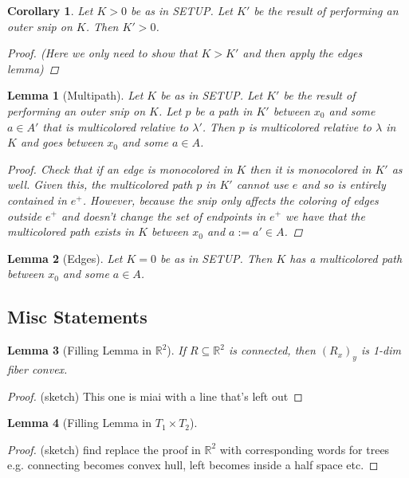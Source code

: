 \documentclass{article}
\newcommand{\rxy}{(R_x)_y}
\theoremstyle{mystyle}
\newtheorem{lem}{Lemma}[section]
\newtheorem*{cor*}{Corollary}
\theoremstyle{remark}
\begin{document}
\begin{cor*}
	Let \(K > 0\) be as in SETUP. Let \(K'\) be the result of performing an outer snip on \(K\). Then \(K' > 0\).
	\begin{proof}
        (Here we only need to show that \(K > K'\) and then apply the edges lemma)
		
	\end{proof}
\end{cor*}
\begin{lem}
	[Multipath]
	 \label{lem:multi} 
	Let \(K\) be as in SETUP. Let \(K'\) be the result of performing an outer snip on \(K\). Let \(p\) be a path in \(K'\) between \(x_{0}\) and some \(a \in A'\) that is {\em multicolored} relative to \(\lambda'\). Then \(p\) is multicolored relative to \(\lambda\) in \(K\) and goes between \(x_{0}\) and some \(a \in A\).
	\begin{proof}
		Check that if an edge is monocolored in \(K\) then it is monocolored in \(K'\) as well. Given this, the multicolored path \(p\) in \(K'\) cannot use \(e\) and so is entirely contained in \(e^{+}\). However, because the snip only affects the coloring of edges outside \(e^{+}\) and doesn't change the set of endpoints in \(e^{+}\) we have that the multicolored path exists in \(K\) between \(x_{0}\) and \(a:=a' \in A\).
	\end{proof}
\end{lem}
\begin{lem}
	[Edges]
	 \label{edges} 
	  Let \(K=0\) be as in SETUP. Then \(K\) has a multicolored path between \(x_{0}\) and some \(a \in A\).
\end{lem}%
\subsection{Misc Statements}%
\begin{lem}
    [Filling Lemma in \(\mathbb{R}^{2}\)]
	\label{lem:fillr2}
	If \(R \subseteq \mathbb{R}^{2}\) is connected, then \(\rxy\) is 1-dim fiber convex.
\end{lem}
\begin{proof}
    (sketch) This one is miai with a line that's left out
\end{proof}
\begin{lem}
    [Filling Lemma in \(T_{1} \times T_{2}\)]
	\label{lem:fillt2}
\end{lem}
\begin{proof}
    (sketch) find replace the proof in \(\mathbb{R}^{2}\) with corresponding words for trees e.g. connecting becomes convex hull, left becomes inside a half space etc.
\end{proof}%
\end{document}
